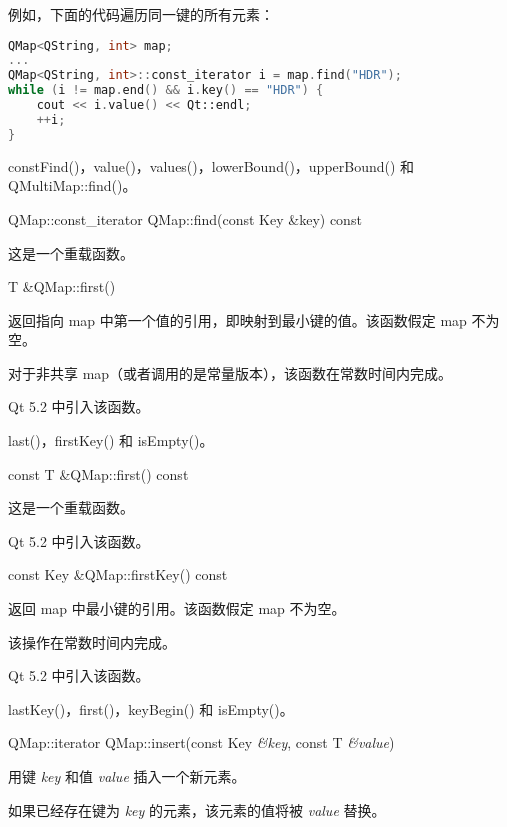 例如，下面的代码遍历同一键的所有元素：

\begin{lstlisting}[language=C++]
QMap<QString, int> map;
...
QMap<QString, int>::const_iterator i = map.find("HDR");
while (i != map.end() && i.key() == "HDR") {
    cout << i.value() << Qt::endl;
    ++i;
}
\end{lstlisting}

\begin{seeAlso}
constFind()，value()，values()，lowerBound()，upperBound() 和 QMultiMap::find()。
\end{seeAlso}

\splitLine

QMap::const\_iterator QMap::find(const Key \&key) const

这是一个重载函数。

\splitLine

T \&QMap::first()

返回指向 map 中第一个值的引用，即映射到最小键的值。该函数假定 map 不为空。

对于非共享 map（或者调用的是常量版本），该函数在常数时间内完成。

Qt 5.2 中引入该函数。


\begin{seeAlso}
last()，firstKey() 和 isEmpty()。
\end{seeAlso}

\splitLine

const T \&QMap::first() const

这是一个重载函数。

Qt 5.2 中引入该函数。

\splitLine

const Key \&QMap::firstKey() const

返回 map 中最小键的引用。该函数假定 map 不为空。

该操作在常数时间内完成。

Qt 5.2 中引入该函数。


\begin{seeAlso}
lastKey()，first()，keyBegin() 和 isEmpty()。
\end{seeAlso}

\splitLine

QMap::iterator QMap::insert(const Key \emph{\&key}, const T \emph{\&value})

用键 \emph{key} 和值 \emph{value} 插入一个新元素。

如果已经存在键为 \emph{key} 的元素，该元素的值将被 \emph{value} 替换。

